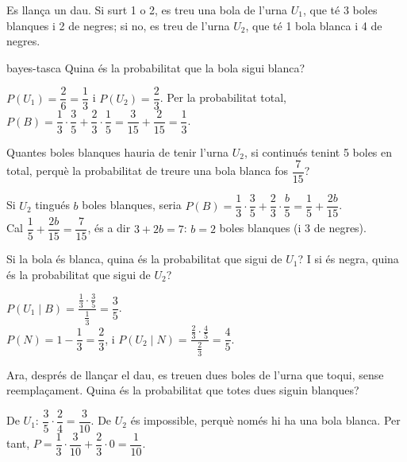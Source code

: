 Es llança un dau. Si surt 1 o 2, es treu una bola de l'urna $U_1$, que té 3 boles blanques i 2 de negres; si
no, es treu de l'urna $U_2$, que té 1 bola blanca i 4 de negres.

\begin{apartats}

\begin{tria}{bayes-tasca}
Quina és la probabilitat que la bola sigui blanca?

\begin{solucio}
$P(U_1)=\dfrac26=\dfrac13$ i $P(U_2)=\dfrac23$. Per la probabilitat total,
$P(B)=\dfrac13\cdot\dfrac35+\dfrac23\cdot\dfrac15=\dfrac3{15}+\dfrac2{15}=\dfrac13$.
\end{solucio}

Quantes boles blanques hauria de tenir l'urna $U_2$, si continués tenint 5 boles en total, perquè la
probabilitat de treure una bola blanca fos $\dfrac7{15}$?

\begin{solucio}
Si $U_2$ tingués $b$ boles blanques, seria
$P(B)=\dfrac13\cdot\dfrac35+\dfrac23\cdot\dfrac b5=\dfrac15+\dfrac{2b}{15}$.\\
Cal $\dfrac15+\dfrac{2b}{15}=\dfrac7{15}$, és a dir $3+2b=7$: $\boxed{b=2}$ boles blanques (i 3 de
negres).
\end{solucio}
\end{tria}

Si la bola és blanca, quina és la probabilitat que sigui de $U_1$? I si és negra, quina és la probabilitat
que sigui de $U_2$?

\begin{solucio}
$P(U_1\mid B)=\dfrac{\frac13\cdot\frac35}{\frac13}=\dfrac35$.\\
$P(N)=1-\dfrac13=\dfrac23$, i $P(U_2\mid N)=\dfrac{\frac23\cdot\frac45}{\frac23}=\dfrac45$.
\end{solucio}

\begin{nomesllarg}
Ara, després de llançar el dau, es treuen dues boles de l'urna que toqui, sense reemplaçament. Quina és la
probabilitat que totes dues siguin blanques?

\begin{solucio}
De $U_1$: $\dfrac35\cdot\dfrac24=\dfrac3{10}$. De $U_2$ és impossible, perquè només hi ha una bola blanca.
Per tant, $P=\dfrac13\cdot\dfrac3{10}+\dfrac23\cdot0=\dfrac1{10}$.
\end{solucio}
\end{nomesllarg}

\end{apartats}
